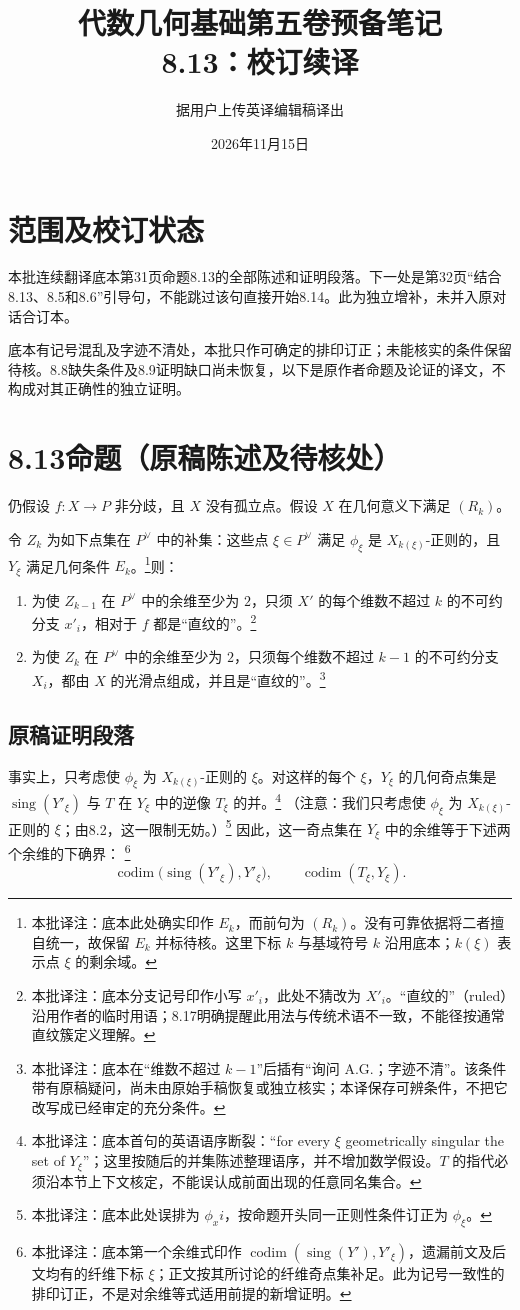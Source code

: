 \documentclass[openany]{ctexbook}
\title{代数几何基础第五卷预备笔记\\8.13：校订续译}
\author{据用户上传英译编辑稿译出}
\date{2026年11月15日}
\newcommand{\note}[1]{\footnote{本批译注：#1}}
\begin{document}
\maketitle
\chapter*{范围及校订状态}
本批连续翻译底本第31页命题8.13的全部陈述和证明段落。下一处是第32页“结合8.13、8.5和8.6”引导句，不能跳过该句直接开始8.14。此为独立增补，未并入原对话合订本。

底本有记号混乱及字迹不清处，本批只作可确定的排印订正；未能核实的条件保留待核。8.8缺失条件及8.9证明缺口尚未恢复，以下是原作者命题及论证的译文，不构成对其正确性的独立证明。
\chapter*{8.13\quad 命题（原稿陈述及待核处）}
仍假设 $f\colon X\to P$ 非分歧，且 $X$ 没有孤立点。假设 $X$ 在几何意义下满足 $(R_k)$。

令 $Z_k$ 为如下点集在 $P^\vee$ 中的补集：这些点 $\xi\in P^\vee$ 满足 $\phi_\xi$ 是 $X_{k(\xi)}$-正则的，且 $Y_\xi$ 满足几何条件 $E_k$。\note{底本此处确实印作 $E_k$，而前句为 $(R_k)$。没有可靠依据将二者擅自统一，故保留 $E_k$ 并标待核。这里下标 $k$ 与基域符号 $k$ 沿用底本；$k(\xi)$ 表示点 $\xi$ 的剩余域。}则：
\begin{enumerate}
\item[(a)] 为使 $Z_{k-1}$ 在 $P^\vee$ 中的余维至少为 $2$，只须 $X'$ 的每个维数不超过 $k$ 的不可约分支 $x'_i$，相对于 $f$ 都是“直纹的”。\note{底本分支记号印作小写 $x'_i$，此处不猜改为 $X'_i$。“直纹的”（ruled）沿用作者的临时用语；8.17明确提醒此用法与传统术语不一致，不能径按通常直纹簇定义理解。}
\item[(b)] 为使 $Z_k$ 在 $P^\vee$ 中的余维至少为 $2$，只须每个维数不超过 $k-1$ 的不可约分支 $X_i$，都由 $X$ 的光滑点组成，并且是“直纹的”。\note{底本在“维数不超过 $k-1$”后插有“询问 A.G.；字迹不清”。该条件带有原稿疑问，尚未由原始手稿恢复或独立核实；本译保存可辨条件，不把它改写成已经审定的充分条件。}
\end{enumerate}

\newpage
\section*{原稿证明段落}
事实上，只考虑使 $\phi_\xi$ 为 $X_{k(\xi)}$-正则的 $\xi$。对这样的每个 $\xi$，$Y_\xi$ 的几何奇点集是 $\operatorname{sing}(Y'_\xi)$ 与 $T$ 在 $Y_\xi$ 中的逆像 $T_\xi$ 的并。\note{底本首句的英语语序断裂：“for every $\xi$ geometrically singular the set of $Y_\xi$”；这里按随后的并集陈述整理语序，并不增加数学假设。$T$ 的指代必须沿本节上下文核定，不能误认成前面出现的任意同名集合。}
（注意：我们只考虑使 $\phi_\xi$ 为 $X_{k(\xi)}$-正则的 $\xi$；由8.2，这一限制无妨。）\note{底本此处误排为 $\phi_{x}i$，按命题开头同一正则性条件订正为 $\phi_\xi$。}
因此，这一奇点集在 $Y_\xi$ 中的余维等于下述两个余维的下确界：
\note{底本第一个余维式印作 $\operatorname{codim}(\operatorname{sing}(Y'),Y'_\xi)$，遗漏前文及后文均有的纤维下标 $\xi$；正文按其所讨论的纤维奇点集补足。此为记号一致性的排印订正，不是对余维等式适用前提的新增证明。}
\[
\operatorname{codim}\bigl(\operatorname{sing}(Y'_\xi),Y'_\xi\bigr),
\qquad
\operatorname{codim}(T_\xi,Y_\xi).
\]
\end{document}
